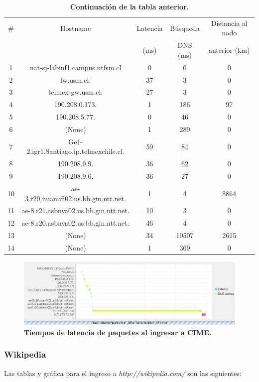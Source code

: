 \documentclass[12pt]{article}
\begin{document}
\begin{table}[H]
\centering
\begin{tabular}{| c | c | c | c | c |}
\hline
\# & Hostname & Latencia & Búsqueda & Distancia al nodo\\
 &  & (ms) & DNS (ms) & anterior (km)\\
\hline
1 & nat-sj-labinf1.campus.utfsm.cl & 0 & 0 & 0\\
\hline
2 & fw.usm.cl. & 37 & 3 & 0\\
\hline
3 & telmex-gw.usm.cl. & 27 & 3 & 0\\
\hline
4 & 190.208.0.173. & 1 & 186 & 97\\
\hline
5 & 190.208.5.77. & 0 & 46 & 0\\
\hline
6 & (None) & 1 & 289 & 0\\
\hline
7 & Ge1-2.igr1.Santiago.ip.telmexchile.cl. & 59 & 84 & 0\\
\hline
8 & 190.208.9.9. & 36 & 62 & 0\\
\hline
9 & 190.208.9.6. & 36 & 27 & 0\\
\hline
10 & ae-3.r20.miamifl02.us.bb.gin.ntt.net. & 1 & 4 & 8864\\
\hline
11 & ae-8.r21.asbnva02.us.bb.gin.ntt.net. & 10 & 3 & 0\\
\hline
12 & ae-8.r20.asbnva02.us.bb.gin.ntt.net. & 46 & 4 & 0\\
\hline
13 & (None) & 34 & 10507 & 2615\\
\hline
14 & (None) & 1 & 369 & 0\\
\hline
\end{tabular}
\caption{\small \textbf{Continuación de la tabla anterior.}}
\end{table}

\begin{figure}[H] 
\centering 
\includegraphics[width=1\textwidth]{imagenes/cime_grafica.png} \caption{\small \textbf{Tiempos de latencia de paquetes al ingresar a CIME.}}
\label{fig:diagrama_1} 
\end{figure}

\subsubsection{Wikipedia}
Las tablas y gráfica para el ingreso a \emph{http://wikipedia.com/} son las siguientes:\\
\end{document}
